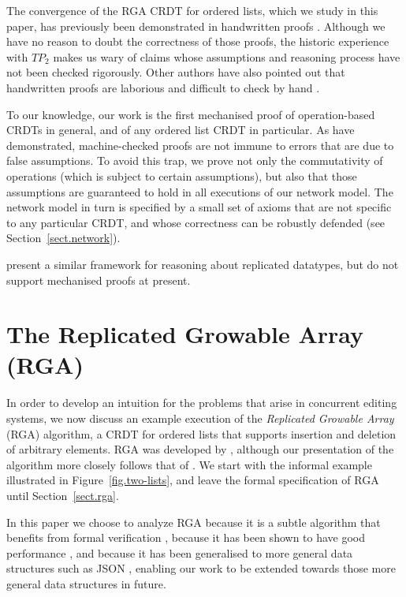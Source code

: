 The convergence of the RGA CRDT for ordered lists, which we study in this paper, has previously been
demonstrated in handwritten proofs \cite{Attiya:2016kh,Kleppmann:2016ve,Roh:2009ws}. Although we
have no reason to doubt the correctness of those proofs, the historic experience with
$\mathit{TP}_2$ makes us wary of claims whose assumptions and reasoning process have not been
checked rigorously. Other authors have also pointed out that handwritten proofs are laborious and
difficult to check by hand \cite{Li:2008hw,Li:2005jq}.

To our knowledge, our work is the first mechanised proof of operation-based CRDTs in general, and of
any ordered list CRDT in particular. As \citet{Oster:2005vi} have demonstrated, machine-checked
proofs are not immune to errors that are due to false assumptions. To avoid this trap, we prove not
only the commutativity of operations (which is subject to certain assumptions), but also that those
assumptions are guaranteed to hold in all executions of our network model. The network model in turn
is specified by a small set of axioms that are not specific to any particular CRDT, and whose
correctness can be robustly defended (see Section~\ref{sect.network}).

\citet{Burckhardt:2014ft} present a similar framework for reasoning about replicated datatypes, but
do not support mechanised proofs at present.


\section{The Replicated Growable Array (RGA)}\label{sect.rga.background}

In order to develop an intuition for the problems that arise in concurrent editing systems, we now
discuss an example execution of the \emph{Replicated Growable Array} (RGA) algorithm, a CRDT for
ordered lists that supports insertion and deletion of arbitrary elements. RGA was developed by
\citet{Roh:2011dw}, although our presentation of the algorithm more closely follows that of
\citet{Shapiro:2011wy}. We start with the informal example illustrated in
Figure~\ref{fig.two-lists}, and leave the formal specification of RGA until Section~\ref{sect.rga}.

In this paper we
choose to analyze RGA because it is a subtle algorithm that benefits from formal verification
\cite{Attiya:2016kh}, because it has been shown to have good performance \cite{Mehdi:2011ke}, and
because it has been generalised to more general data structures such as JSON
\cite{Kleppmann:2016ve}, enabling our work to be extended towards those more general data structures
in future.

